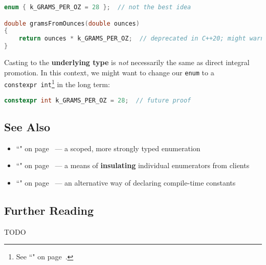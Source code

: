 \begin{lstlisting}[language=C++]
enum { k_GRAMS_PER_OZ = 28 };  // not the best idea

double gramsFromOunces(double ounces)
{
    return ounces * k_GRAMS_PER_OZ;  // deprecated in C++20; might warn
}
\end{lstlisting}

\noindent Casting to the \textbf{underlying type} is \emph{not} necessarily the
same as direct integral promotion. In this context, we might want to
change our \texttt{enum} to a
\texttt{constexpr}~\texttt{int}{\cprotect\footnote{See
  ``" on page~\pageref{constexprvar}.}} in the long
term:

\begin{lstlisting}[language=C++]
constexpr int k_GRAMS_PER_OZ = 28;  // future proof
\end{lstlisting}


\subsection[See Also]{See Also}\label{see-also}

\begin{itemize}
\item{``" on page~\pageref{enumclass} — a scoped, more strongly typed enumeration}
\item{``" on page~\pageref{enumopaque} — a means of \textbf{insulating} individual enumerators from clients}
\item{``" on page~\pageref{constexprvar} — an alternative way of declaring compile-time constants}
\end{itemize}

\subsection[Further Reading]{Further Reading}\label{further-reading}

TODO


